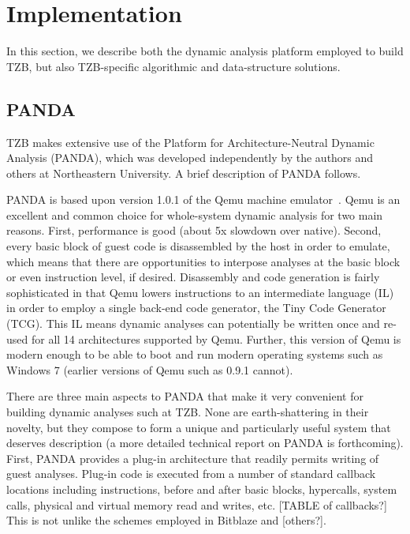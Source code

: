 \section{Implementation}
\label{sec:implementation}

In this section, we describe both the dynamic analysis platform employed to build TZB, but also TZB-specific algorithmic and data-structure solutions.

\subsection{PANDA}
TZB makes extensive use of the Platform for Architecture-Neutral Dynamic Analysis (PANDA), which was developed independently by the authors and others at Northeastern University.
A brief description of PANDA follows.

PANDA is based upon version 1.0.1 of the Qemu machine emulator~\cite{Bellard:2005}.
Qemu is an excellent and common choice for whole-system dynamic analysis for two main reasons.
First, performance is good (about 5x slowdown over native).
Second, every basic block of guest code is disassembled by the host in order to emulate, which means that there are opportunities to interpose analyses at the basic block or even instruction level, if desired.
Disassembly and code generation is fairly sophisticated in that Qemu lowers instructions to an intermediate language (IL) in order to employ a single back-end code generator, the Tiny Code Generator (TCG).  
This IL means dynamic analyses can potentially be written once and re-used for all 14 architectures supported by Qemu.
Further, this version of Qemu is modern enough to be able to boot and run modern operating systems such as Windows 7 (earlier versions of Qemu such as 0.9.1 cannot).

There are three main aspects to PANDA that make it very convenient for building dynamic analyses such at TZB.
None are earth-shattering in their novelty, but they compose to form a unique and particularly useful system that deserves description (a more detailed technical report on PANDA is forthcoming).
First, PANDA provides a plug-in architecture that readily permits writing of guest analyses.
Plug-in code is executed from a number of standard callback locations including instructions, before and after basic blocks, hypercalls, system calls, physical and virtual memory read and writes, etc.  
[TABLE of callbacks?]
This is not unlike the schemes employed in Bitblaze and [others?]\cite{Song:2008bitblaze}.

